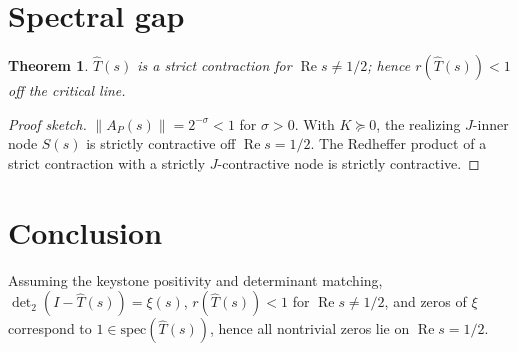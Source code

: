 \documentclass[11pt]{article}
\newcommand{\ReS}{\operatorname{Re}}
\newcommand{\spec}{\mathrm{spec}}
\newcommand{\detTwo}{\det\nolimits_{2}}
\newcommand{\xiFun}{\xi}
\theoremstyle{plain}
\newtheorem{theorem}{Theorem}
\theoremstyle{definition}
\theoremstyle{remark}
\begin{document}
\section{Spectral gap}
\begin{theorem}
$\widehat{T}(s)$ is a strict contraction for $\ReS s\ne 1/2$; hence $r(\widehat{T}(s))<1$ off the critical line.
\end{theorem}
\begin{proof}[Proof sketch]
$\|A_P(s)\|=2^{-\sigma}<1$ for $\sigma>0$. With $K\succeq 0$, the realizing $J$-inner node $S(s)$ is strictly contractive off $\ReS s=1/2$. The Redheffer product of a strict contraction with a strictly $J$-contractive node is strictly contractive.
\end{proof}

\section{Conclusion}
Assuming the keystone positivity and determinant matching, $\detTwo(I - \widehat{T}(s))=\xiFun(s)$, $r(\widehat{T}(s))<1$ for $\ReS s\ne 1/2$, and zeros of $\xiFun$ correspond to $1\in\spec(\widehat{T}(s))$, hence all nontrivial zeros lie on $\ReS s=1/2$.
\end{document}
